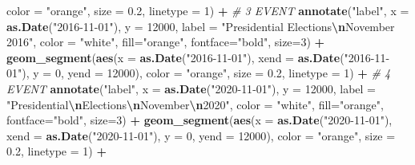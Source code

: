 \documentclass[
]{article}
\newenvironment{Shaded}{\begin{snugshade}}{\end{snugshade}}
\newcommand{\AttributeTok}[1]{\textcolor[rgb]{0.13,0.29,0.53}{#1}}
\newcommand{\CommentTok}[1]{\textcolor[rgb]{0.56,0.35,0.01}{\textit{#1}}}
\newcommand{\DecValTok}[1]{\textcolor[rgb]{0.00,0.00,0.81}{#1}}
\newcommand{\FloatTok}[1]{\textcolor[rgb]{0.00,0.00,0.81}{#1}}
\newcommand{\FunctionTok}[1]{\textcolor[rgb]{0.13,0.29,0.53}{\textbf{#1}}}
\newcommand{\NormalTok}[1]{#1}
\newcommand{\SpecialCharTok}[1]{\textcolor[rgb]{0.81,0.36,0.00}{\textbf{#1}}}
\newcommand{\StringTok}[1]{\textcolor[rgb]{0.31,0.60,0.02}{#1}}
\begin{document}
\begin{Shaded}
\begin{Highlighting}[]
               \AttributeTok{color =} \StringTok{"orange"}\NormalTok{, }\AttributeTok{size =} \FloatTok{0.2}\NormalTok{, }\AttributeTok{linetype =} \DecValTok{1}\NormalTok{) }\SpecialCharTok{+}
  \CommentTok{\# 3 EVENT}
  \FunctionTok{annotate}\NormalTok{(}\StringTok{"label"}\NormalTok{, }\AttributeTok{x =} \FunctionTok{as.Date}\NormalTok{(}\StringTok{"2016{-}11{-}01"}\NormalTok{), }\AttributeTok{y =} \DecValTok{12000}\NormalTok{, }
           \AttributeTok{label =} \StringTok{"Presidential Elections}\SpecialCharTok{\textbackslash{}n}\StringTok{November 2016"}\NormalTok{, }\AttributeTok{color =} \StringTok{"white"}\NormalTok{, }\AttributeTok{fill=}\StringTok{"orange"}\NormalTok{, }\AttributeTok{fontface=}\StringTok{"bold"}\NormalTok{, }\AttributeTok{size=}\DecValTok{3}\NormalTok{) }\SpecialCharTok{+}
  \FunctionTok{geom\_segment}\NormalTok{(}\FunctionTok{aes}\NormalTok{(}\AttributeTok{x =} \FunctionTok{as.Date}\NormalTok{(}\StringTok{"2016{-}11{-}01"}\NormalTok{), }\AttributeTok{xend =} \FunctionTok{as.Date}\NormalTok{(}\StringTok{"2016{-}11{-}01"}\NormalTok{), }\AttributeTok{y =} \DecValTok{0}\NormalTok{, }\AttributeTok{yend =} \DecValTok{12000}\NormalTok{), }
               \AttributeTok{color =} \StringTok{"orange"}\NormalTok{, }\AttributeTok{size =} \FloatTok{0.2}\NormalTok{, }\AttributeTok{linetype =} \DecValTok{1}\NormalTok{) }\SpecialCharTok{+}
  \CommentTok{\# 4 EVENT}
  \FunctionTok{annotate}\NormalTok{(}\StringTok{"label"}\NormalTok{, }\AttributeTok{x =} \FunctionTok{as.Date}\NormalTok{(}\StringTok{"2020{-}11{-}01"}\NormalTok{), }\AttributeTok{y =} \DecValTok{12000}\NormalTok{, }
           \AttributeTok{label =} \StringTok{"Presidential}\SpecialCharTok{\textbackslash{}n}\StringTok{Elections}\SpecialCharTok{\textbackslash{}n}\StringTok{November}\SpecialCharTok{\textbackslash{}n}\StringTok{2020"}\NormalTok{, }\AttributeTok{color =} \StringTok{"white"}\NormalTok{, }\AttributeTok{fill=}\StringTok{"orange"}\NormalTok{, }\AttributeTok{fontface=}\StringTok{"bold"}\NormalTok{, }\AttributeTok{size=}\DecValTok{3}\NormalTok{) }\SpecialCharTok{+}
  \FunctionTok{geom\_segment}\NormalTok{(}\FunctionTok{aes}\NormalTok{(}\AttributeTok{x =} \FunctionTok{as.Date}\NormalTok{(}\StringTok{"2020{-}11{-}01"}\NormalTok{), }\AttributeTok{xend =} \FunctionTok{as.Date}\NormalTok{(}\StringTok{"2020{-}11{-}01"}\NormalTok{), }\AttributeTok{y =} \DecValTok{0}\NormalTok{, }\AttributeTok{yend =} \DecValTok{12000}\NormalTok{), }
               \AttributeTok{color =} \StringTok{"orange"}\NormalTok{, }\AttributeTok{size =} \FloatTok{0.2}\NormalTok{, }\AttributeTok{linetype =} \DecValTok{1}\NormalTok{) }\SpecialCharTok{+}

\end{Highlighting}
\end{Shaded}
\end{document}
